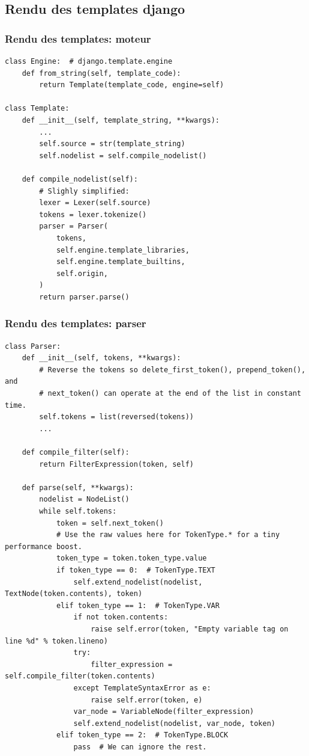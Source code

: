 \documentclass{beamer}
\begin{document}
\subsection*{Rendu des templates django}

\begin{frame}[fragile]
    \frametitle{Rendu des templates: moteur}

    \begin{verbatim}
class Engine:  # django.template.engine
    def from_string(self, template_code):
        return Template(template_code, engine=self)

class Template:
    def __init__(self, template_string, **kwargs):
        ...
        self.source = str(template_string)
        self.nodelist = self.compile_nodelist()

    def compile_nodelist(self):
        # Slighly simplified:
        lexer = Lexer(self.source)
        tokens = lexer.tokenize()
        parser = Parser(
            tokens,
            self.engine.template_libraries,
            self.engine.template_builtins,
            self.origin,
        )
        return parser.parse()
    \end{verbatim}
\end{frame}

\begin{frame}[fragile]
    \frametitle{Rendu des templates: parser}

    \vspace{-0.3cm}

    \begin{verbatim}
class Parser:
    def __init__(self, tokens, **kwargs):
        # Reverse the tokens so delete_first_token(), prepend_token(), and
        # next_token() can operate at the end of the list in constant time.
        self.tokens = list(reversed(tokens))
        ...

    def compile_filter(self):
        return FilterExpression(token, self)

    def parse(self, **kwargs):
        nodelist = NodeList()
        while self.tokens:
            token = self.next_token()
            # Use the raw values here for TokenType.* for a tiny performance boost.
            token_type = token.token_type.value
            if token_type == 0:  # TokenType.TEXT
                self.extend_nodelist(nodelist, TextNode(token.contents), token)
            elif token_type == 1:  # TokenType.VAR
                if not token.contents:
                    raise self.error(token, "Empty variable tag on line %d" % token.lineno)
                try:
                    filter_expression = self.compile_filter(token.contents)
                except TemplateSyntaxError as e:
                    raise self.error(token, e)
                var_node = VariableNode(filter_expression)
                self.extend_nodelist(nodelist, var_node, token)
            elif token_type == 2:  # TokenType.BLOCK
                pass  # We can ignore the rest.
    \end{verbatim}
\end{frame}
\end{document}
